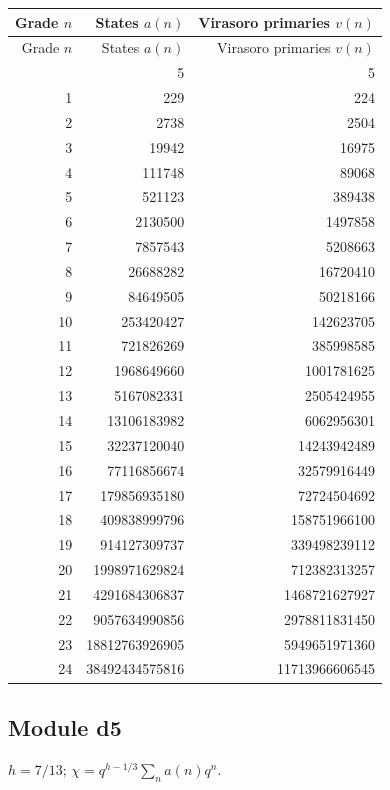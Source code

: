 \begingroup\small
\setlength{\tabcolsep}{5pt}
\begin{longtable}{@{}rrr@{}}
\toprule
Grade $n$ & States $a(n)$ & Virasoro primaries $v(n)$\\
\midrule\endfirsthead
\toprule
Grade $n$ & States $a(n)$ & Virasoro primaries $v(n)$\\
\midrule\endhead
\bottomrule\endfoot
0 & 5 & 5\\
1 & 229 & 224\\
2 & 2738 & 2504\\
3 & 19942 & 16975\\
4 & 111748 & 89068\\
5 & 521123 & 389438\\
6 & 2130500 & 1497858\\
7 & 7857543 & 5208663\\
8 & 26688282 & 16720410\\
9 & 84649505 & 50218166\\
10 & 253420427 & 142623705\\
11 & 721826269 & 385998585\\
12 & 1968649660 & 1001781625\\
13 & 5167082331 & 2505424955\\
14 & 13106183982 & 6062956301\\
15 & 32237120040 & 14243942489\\
16 & 77116856674 & 32579916449\\
17 & 179856935180 & 72724504692\\
18 & 409838999796 & 158751966100\\
19 & 914127309737 & 339498239112\\
20 & 1998971629824 & 712382313257\\
21 & 4291684306837 & 1468721627927\\
22 & 9057634990856 & 2978811831450\\
23 & 18812763926905 & 5949651971360\\
24 & 38492434575816 & 11713966606545\\
\end{longtable}
\endgroup

\subsection{Module d5}
$h=7/13$; $\chi=q^{h-1/3}\sum_n a(n)q^n$.

